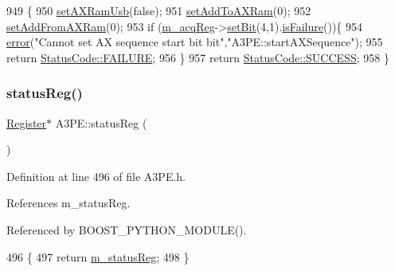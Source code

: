 \begin{DoxyCode}
949                                 \{
950   \hyperlink{classA3PE_a77ccfbd9df2fad96a9a9f1dc579a7a2d}{setAXRamUsb}(\textcolor{keyword}{false});
951   \hyperlink{classA3PE_a54fe4da570ea8833fe2c981de1085387}{setAddToAXRam}(0);
952   \hyperlink{classA3PE_a834fde5951d2c1bf6b41842520360fce}{setAddFromAXRam}(0);
953   \textcolor{keywordflow}{if} (\hyperlink{classA3PE_abaf426f4c9192537117b77f9f4821e04}{m\_acqReg}->\hyperlink{classRegister_ab094246dd12aa7e0aa0ca917f4e70b31}{setBit}(4,1).\hyperlink{classStatusCode_a5dd22dc6eb2c52fc4cabc58f6dea2eb7}{isFailure}())\{
954     \hyperlink{classObject_a204a95f57818c0f811933917a30eff45}{error}(\textcolor{stringliteral}{"Cannot set AX sequence start bit bit"},\textcolor{stringliteral}{"A3PE::startAXSequence"});
955     \textcolor{keywordflow}{return} \hyperlink{classStatusCode_a6f565cbeadc76d14c72f047e5e85eb4ba3da73d4c469762eb9d3c960368252b26}{StatusCode::FAILURE};
956   \}
957   \textcolor{keywordflow}{return} \hyperlink{classStatusCode_a6f565cbeadc76d14c72f047e5e85eb4badd0da38d3ba0d922efd1f4619bc37ad8}{StatusCode::SUCCESS};
958 \}
\end{DoxyCode}
\mbox{\label{classA3PE_af260fc8bce78935b7bad57c987574683}} 
\subsubsection{\texorpdfstring{status\+Reg()}{statusReg()}}
{\footnotesize\ttfamily \hyperlink{classRegister}{Register}$\ast$ A3\+P\+E\+::status\+Reg (\begin{DoxyParamCaption}{ }\end{DoxyParamCaption})\hspace{0.3cm}{\ttfamily [inline]}}



Definition at line 496 of file A3\+P\+E.\+h.



References m\+\_\+status\+Reg.



Referenced by B\+O\+O\+S\+T\+\_\+\+P\+Y\+T\+H\+O\+N\+\_\+\+M\+O\+D\+U\+L\+E().


\begin{DoxyCode}
496                        \{
497     \textcolor{keywordflow}{return} \hyperlink{classA3PE_a2281e3d12a2dffad99ec55be2b695f53}{m\_statusReg};
498   \}
\end{DoxyCode}
\mbox{\label{classA3PE_af241373059bad4a3c376ab2ac98a7b29}} 
